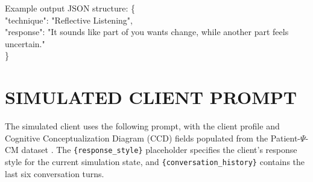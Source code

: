\begin{tcolorbox}[
    breakable,
    colback=gray!10,
    colframe=gray!40,
    boxrule=0.5pt,
    arc=3mm,
    left=4mm, right=4mm, top=3mm, bottom=3mm
]
Example output JSON structure:
\begingroup
\ttfamily
\{\\
\hspace*{1em}"technique": "Reflective Listening",\\
\hspace*{1em}"response": "It sounds like part of you wants change, while another part feels uncertain."\\
\}
\par
\endgroup
\end{tcolorbox}


\clearpage
{}
{}
\stoptocwriting
\chapter{SIMULATED CLIENT PROMPT}
\label{app:client-prompt}
\resumetocwriting

The simulated client uses the following prompt, with the client profile and Cognitive Conceptualization Diagram (CCD) fields populated from the Patient-\(\Psi\)-CM dataset \cite{wang2024patientpsi}. The \texttt{\{response\_style\}} placeholder specifies the client's response style for the current simulation state, and \texttt{\{conversation\_history\}} contains the last six conversation turns.

